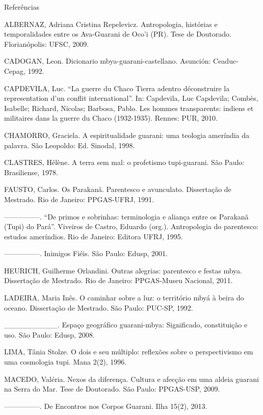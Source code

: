 \documentclass{article}
\begin{document}
Refer\^encias

ALBERNAZ, Adriana Cristina Repelevicz. Antropologia, hist\'orias e
temporalidades entre os Ava-Guarani de Oco{\textquoteright}i (PR). Tese
de Doutorado. Florian\'opolis: UFSC, 2009.

CADOGAN, Leon. Dicionario mbya-guarani-castellano. Asunci\'on: Ceaduc-
Cepag, 1992.

CAPDEVILA, Luc. {\textquotedblleft}La guerre du Chaco Tierra adentro
d\'econstruire la representation d{\textquoteright}un conflit
international{\textquotedblright}. In: Capdevila, Luc Capdevila;
Comb\`es, Isabelle; Richard, Nicolas; Barbosa, Pablo. Les hommes
transparents: indiens et militaires dans la guerre du Chaco
(1932-1935). Rennes: PUR, 2010.

CHAMORRO, Graciela.  A espiritualidade guarani: uma teologia amer\'india
da palavra. S\~ao Leopoldo: Ed. Sinodal, 1998.

CLASTRES, H\'el\`ene. A terra sem mal: o profetismo tupi-guarani. S\~ao
Paulo: Brasiliense, 1978.

FAUSTO, Carlos. Os Parakan\~a. Parentesco e avunculato.
Disserta\c{c}\~ao de Mestrado. Rio de Janeiro: PPGAS-UFRJ, 1991.

{}---{}---{}---{}---{}---. {\textquotedblleft}De primos e sobrinhas:
terminologia e alian\c{c}a entre os Parakan\~a (Tupi) do
Par\'a{\textquotedblright}. Viveiros de Castro, Eduardo (org.).
Antropologia do parentesco: estudos amer\'indios. Rio de Janeiro:
Editora UFRJ, 1995.

{}---{}---{}---{}---{}---. Inimigos Fi\'eis. S\~ao Paulo: Edusp, 2001.

HEURICH, Guilherme Orlandini. Outras alegrias: parentesco e festas mbya.
 Disserta\c{c}\~ao de Mestrado. Rio de Janeiro: PPGAS-Museu Nacional,
2011.

LADEIRA, Maria In\^es. O caminhar sobre a luz: o territ\'orio mby\'a \`a
beira do oceano. Disserta\c{c}\~ao de Mestrado. S\~ao Paulo: PUC-SP,
1992.

\_\_\_\_\_\_\_\_\_\_. Espa\c{c}o geogr\'afico guarani-mbya: Significado,
constitui\c{c}\~ao e uso. S\~ao Paulo: Edusp, 2008.

LIMA, T\^ania Stolze. O dois e seu m\'ultiplo: reflex\~oes sobre o
perspectivismo em uma cosmologia tupi. Mana 2(2), 1996.

MACEDO, Val\'eria. Nexos da diferen\c{c}a. Cultura e afec\c{c}\~ao em
uma aldeia guarani na Serra do Mar. Tese de Doutorado. S\~ao Paulo:
PPGAS-USP, 2009.

{}---{}---{}---{}---{}---. De Encontros nos Corpos Guarani. Ilha 15(2),
2013.
\end{document}
